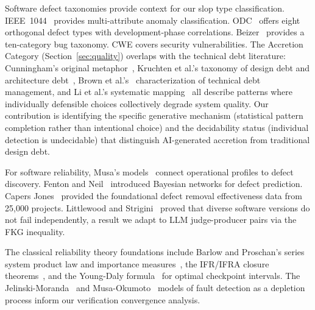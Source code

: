 \documentclass[11pt, a4paper]{googledeepmind}
\begin{document}
Software defect taxonomies provide context for our slop type classification. IEEE~1044~\citep{ieee1044} provides multi-attribute anomaly classification. ODC~\citep{chillarege1992} offers eight orthogonal defect types with development-phase correlations. Beizer~\citep{beizer1990} provides a ten-category bug taxonomy. CWE covers security vulnerabilities. The Accretion Category (Section~\ref{sec:quality}) overlaps with the technical debt literature: Cunningham's original metaphor~\citep{cunningham1992}, Kruchten et al.'s taxonomy of design debt and architecture debt~\citep{kruchten2012}, Brown et al.'s~\citep{brown2010} characterization of technical debt management, and Li et al.'s systematic mapping~\citep{li2015} all describe patterns where individually defensible choices collectively degrade system quality. Our contribution is identifying the specific generative mechanism (statistical pattern completion rather than intentional choice) and the decidability status (individual detection is undecidable) that distinguish AI-generated accretion from traditional design debt.

For software reliability, Musa's models~\citep{musa1987} connect operational profiles to defect discovery. Fenton and Neil~\citep{fenton1999} introduced Bayesian networks for defect prediction. Capers Jones~\citep{capersjones2012} provided the foundational defect removal effectiveness data from 25,000 projects. Littlewood and Strigini~\citep{littlewood1993, littlewood2000} proved that diverse software versions do not fail independently, a result we adapt to LLM judge-producer pairs via the FKG inequality.

The classical reliability theory foundations include Barlow and Proschan's series system product law and importance measures~\citep{barlow1965mathematical, barlow1975statistical}, the IFR/IFRA closure theorems~\citep{birnbaum1961stochastic}, and the Young-Daly formula~\citep{young1974first, daly2006higher} for optimal checkpoint intervals. The Jelinski-Moranda~\citep{jelinski1972software} and Musa-Okumoto~\citep{musa1984logarithmic} models of fault detection as a depletion process inform our verification convergence analysis.
\end{document}
